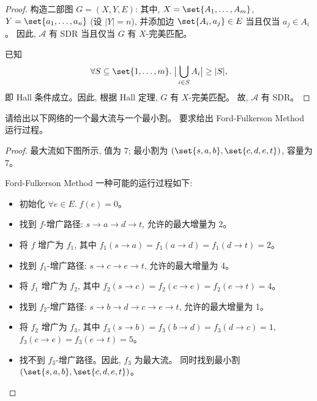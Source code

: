 \documentclass[a4paper, justified]{tufte-handout}
\begin{document}
\begin{proof}
  构造二部图 $G = (X, Y, E)$:
  其中, $X = \set{A_{1}, \dots, A_{m}}$,
  $Y = \set{a_{1}, \dots, a_{n}}$ (设 $|Y| = n$),
  并添加边 $\set{A_{i}, a_{j}} \in E$ 当且仅当 $a_{j} \in A_{i}$。
  因此, $\mathcal{A}$ 有 SDR 当且仅当 $G$ 有 $X$-完美匹配。

  已知
  \[
    \forall S \subseteq \set{1, \dots, m}.\;
      \big\lvert \bigcup_{i \in S} A_{i} \big\rvert \ge |S|,
  \]
  即 Hall 条件成立。因此, 根据 Hall 定理, $G$ 有 $X$-完美匹配。
  故, $\mathcal{A}$ 有 SDR。
\end{proof}

\begin{problem}
  请给出以下网络的一个最大流与一个最小割。
  要求给出 Ford-Fulkerson Method 运行过程。
\end{problem}

\begin{proof}
  最大流如下图所示, 值为 $7$;
  最小割为 $(\set{s, a, b}, \set{c, d, e, t})$, 容量为 $7$。

  Ford-Fulkerson Method 一种可能的运行过程如下:
  \begin{itemize}
    \item 初始化 $\forall e \in E.\; f(e) = 0$。
    \item 找到 $f$-增广路径: $s \to a \to d \to t$, 允许的最大增量为 2。
    \item 将 $f$ 增广为 $f_{1}$,
      其中 $f_{1}(s \to a) = f_{1}(a \to d) = f_{1}(d \to t) = 2$。
    \item 找到 $f_{1}$-增广路径: $s \to c \to e \to t$, 允许的最大增量为 4。
    \item 将 $f_{1}$ 增广为 $f_{2}$,
      其中 $f_{2}(s \to c) = f_{2}(c \to e) = f_{2}(e \to t) = 4$。
    \item 找到 $f_{2}$-增广路径: $s \to b \to d \to c \to e \to t$,
      允许的最大增量为 1。
    \item 将 $f_{2}$ 增广为 $f_{3}$,
      其中 $f_{3}(s \to b) = f_{3}(b \to d) = f_{3}(d \to c) = 1$,
      $f_{3}(c \to e) = f_{3}(e \to t) = 5$。
    \item 找不到 $f_{3}$-增广路径。因此, $f_{3}$ 为最大流。
      同时找到最小割 $(\set{s, a, b}, \set{c, d, e, t})$。
  \end{itemize}
\end{proof}
\end{document}
